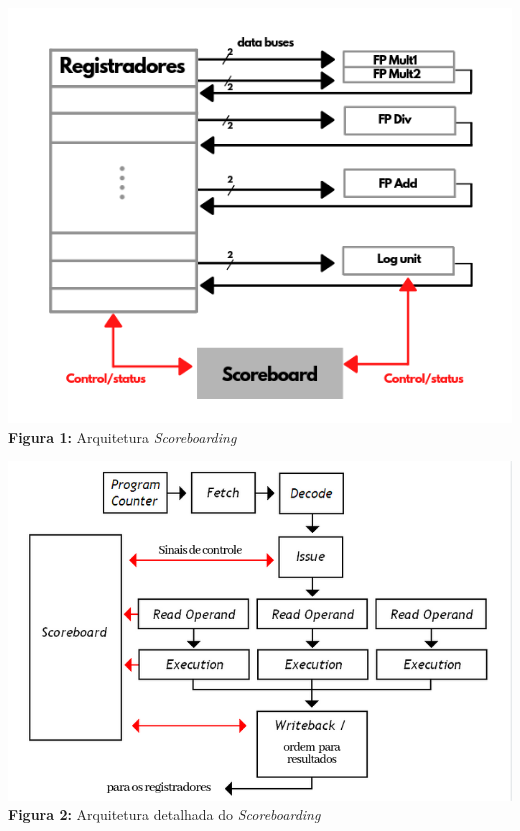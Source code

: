 \documentclass[journal]{IEEEtran}
\begin{document}
\begin{center}
\includegraphics[scale=0.4]{img_Scoreboard.png}\\
\textbf{Figura 1:} Arquitetura \textit{Scoreboarding}
\end{center}

\begin{center}
\includegraphics[scale=0.4]{img_Scoreboarding.png}\\
\textbf{Figura 2:} Arquitetura detalhada do \textit{Scoreboarding}
\end{center}
\end{document}
